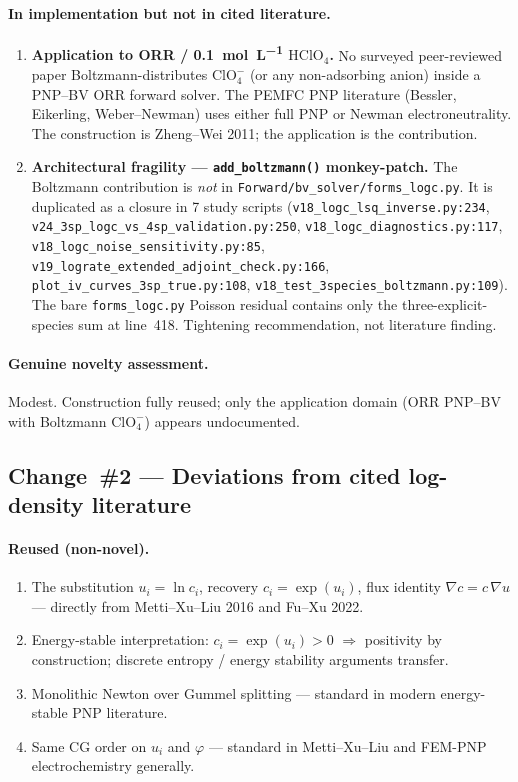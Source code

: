 \documentclass[11pt]{article}
\newcommand{\ClOf}{\mathrm{ClO}_4^{-}}
\begin{document}
\paragraph{In implementation but not in cited literature.}
\begin{enumerate}
\item \textbf{Application to ORR / \SI{0.1}{\mole\per\liter} $\mathrm{HClO}_4$.}
      No surveyed peer-reviewed paper Boltzmann-distributes $\ClOf$ (or any
      non-adsorbing anion) inside a PNP--BV ORR forward solver. The PEMFC
      PNP literature (Bessler, Eikerling, Weber--Newman) uses either full PNP
      or Newman electroneutrality. The construction is Zheng--Wei 2011; the
      application is the contribution.
\item \textbf{Architectural fragility --- \texttt{add\_boltzmann()}
      monkey-patch.} The Boltzmann contribution is \emph{not} in
      \texttt{Forward/bv\_solver/forms\_logc.py}. It is duplicated as a
      closure in 7 study scripts (\texttt{v18\_logc\_lsq\_inverse.py:234},
      \texttt{v24\_3sp\_logc\_vs\_4sp\_validation.py:250},
      \texttt{v18\_logc\_diagnostics.py:117},
      \texttt{v18\_logc\_noise\_sensitivity.py:85},
      \texttt{v19\_lograte\_extended\_adjoint\_check.py:166},
      \texttt{plot\_iv\_curves\_3sp\_true.py:108},
      \texttt{v18\_test\_3species\_boltzmann.py:109}). The bare
      \texttt{forms\_logc.py} Poisson residual contains only the
      three-explicit-species sum at line~418. Tightening recommendation, not
      literature finding.
\end{enumerate}

\paragraph{Genuine novelty assessment.}
Modest. Construction fully reused; only the application domain (ORR PNP--BV
with Boltzmann $\ClOf$) appears undocumented.

\subsection{Change~\#2 --- Deviations from cited log-density literature}

\paragraph{Reused (non-novel).}
\begin{enumerate}
\item The substitution $u_i=\ln c_i$, recovery $c_i=\exp(u_i)$, flux identity
      $\nabla c=c\,\nabla u$ --- directly from Metti--Xu--Liu 2016 and Fu--Xu
      2022.
\item Energy-stable interpretation: $c_i=\exp(u_i)>0$ $\Rightarrow$ positivity
      by construction; discrete entropy / energy stability arguments transfer.
\item Monolithic Newton over Gummel splitting --- standard in modern
      energy-stable PNP literature.
\item Same CG order on $u_i$ and $\varphi$ --- standard in Metti--Xu--Liu and
      FEM-PNP electrochemistry generally.
\end{enumerate}
\end{document}
